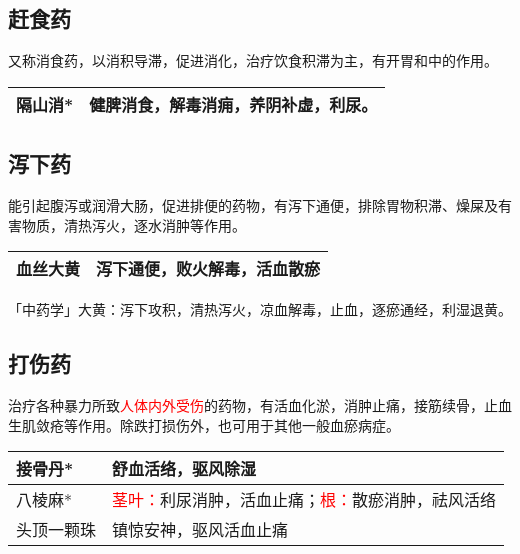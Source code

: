 \documentclass[cn,hazy,blue,12pt,normal,founder]{elegantnote}
\newcommand{\redt}[1]{\textcolor{red}{{}#1}}      %
\begin{document}
\subsection{赶食药}

又称消食药，以消积导滞，促进消化，治疗饮食积滞为主，有开胃和中的作用。

\begin{table}[H]
  \begin{tabular}{|l|l|}
  \hline
  隔山消* & 健脾消食，解毒消痈，养阴补虚，利尿。 \\ \hline
  \end{tabular}
\end{table}

\subsection{泻下药}

能引起腹泻或润滑大肠，促进排便的药物，有泻下通便，排除胃物积滞、燥屎及有害物质，清热泻火，逐水消肿等作用。


\begin{table}[H]
  \begin{tabular}{|l|l|}
  \hline
  血丝大黄 & 泻下通便，败火解毒，活血散瘀  \\ \hline
  \end{tabular}
\end{table}

\begin{note}
「中药学」大黄：泻下攻积，清热泻火，凉血解毒，止血，逐瘀通经，利湿退黄。
\end{note}

\subsection{打伤药}

治疗各种暴力所致\redt{人体内外受伤}的药物，有活血化淤，消肿止痛，接筋续骨，止血生肌敛疮等作用。除跌打损伤外，也可用于其他一般血瘀病症。

\begin{table}[H]
  \begin{tabular}{|l|l|}
  \hline
  接骨丹* & 舒血活络，驱风除湿 \\ \hline
  八棱麻* & \redt{茎叶：}利尿消肿，活血止痛；\redt{根：}散瘀消肿，祛风活络 \\ \hline
  头顶一颗珠 & 镇惊安神，驱风活血止痛 \\ \hline
  \end{tabular}
\end{table}
\end{document}
